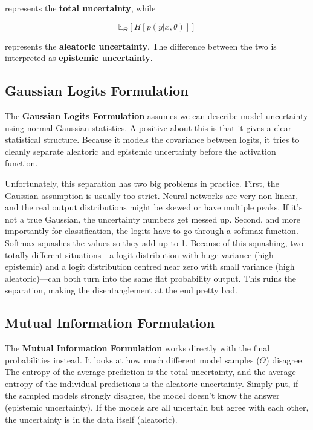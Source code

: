 \documentclass{article}
\begin{document}
represents the \textbf{total uncertainty}, while

\begin{equation*}
    \mathbb{E}_{\Theta}\left[H[p(y|x,\theta)]\right]
\end{equation*}

represents the \textbf{aleatoric uncertainty}. The difference between the two is interpreted as \textbf{epistemic uncertainty}.

\subsection*{Gaussian Logits Formulation}

The \textbf{Gaussian Logits Formulation} assumes we can describe model uncertainty using normal Gaussian statistics. A positive about this is that it gives a clear statistical structure. Because it models the covariance between logits, it tries to cleanly separate aleatoric and epistemic uncertainty before the activation function.

Unfortunately, this separation has two big problems in practice. First, the Gaussian assumption is usually too strict. Neural networks are very non-linear, and the real output distributions might be skewed or have multiple peaks. If it's not a true Gaussian, the uncertainty numbers get messed up. Second, and more importantly for classification, the logits have to go through a softmax function. Softmax squashes the values so they add up to 1. Because of this squashing, two totally different situations—a logit distribution with huge variance (high epistemic) and a logit distribution centred near zero with small variance (high aleatoric)—can both turn into the same flat probability output. This ruins the separation, making the disentanglement at the end pretty bad.

\subsection*{Mutual Information Formulation}

The \textbf{Mutual Information Formulation} works directly with the final probabilities instead. It looks at how much different model samples ($\Theta$) disagree. The entropy of the average prediction is the total uncertainty, and the average entropy of the individual predictions is the aleatoric uncertainty. Simply put, if the sampled models strongly disagree, the model doesn't know the answer (epistemic uncertainty). If the models are all uncertain but agree with each other, the uncertainty is in the data itself (aleatoric).
\end{document}

